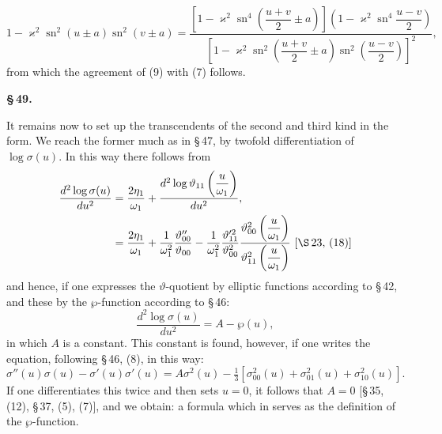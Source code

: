 
\[
1 - \varkappa^2\operatorname{sn}^2(u\pm a)\operatorname{sn}^2(v\pm a) = \dfrac{\left[1-\varkappa^2\operatorname{sn}^4\left(\dfrac{u+v}{2}\pm a\right)\right]\left(1-\varkappa^2\operatorname{sn}^4\dfrac{u-v}{2}\right)}{\left[1-\varkappa^2\operatorname{sn}^2\left(\dfrac{u+v}{2}\pm a\right)\operatorname{sn}^2\!\left(\dfrac{u-v}{2}\right)\right]^2},
\]
from which the agreement of (9) with (7) follows.

\begin{center}
\textbf{\S\,49. \\
}
\end{center}

It remains now to set up the transcendents of the second and
third kind in the  form. We reach the
former much as in \S\,47, by twofold differentiation of
$\log \sigma(u)$. In this way there follows from
\[
\begin{aligned}
\frac{d^2 \log \sigma(u)}{du^2} &= \frac{2\eta_1}{\omega_1} + \frac{d^2\log \vartheta_{11}\left(\dfrac{u}{\omega_1}\right)}{du^2},\\
&= \frac{2\eta_1}{\omega_1} + \frac{1}{\omega_1^2}\frac{\vartheta_{00}''}{\vartheta_{00}} - \frac{1}{\omega_1^2}\frac{\vartheta_{11}'^2}{\vartheta_{00}^2}\frac{\vartheta_{00}^2\left(\dfrac{u}{\omega_1}\right)}{\vartheta_{11}^2\left(\dfrac{u}{\omega_1}\right)} \ [\S\,23,\,(18)]
\end{aligned}
\]
and hence, if one expresses the $\vartheta$-quotient by elliptic
functions according to \S\,42, and these by the $\wp$-function according to \S\,46:
\[
\frac{d^2\log\sigma(u)}{du^2} = A - \wp(u),
\]
in which $A$ is a constant. This constant is found, however, if
one writes the equation, following \S\,46, (8), in this way:
\[
\sigma''(u)\sigma(u) - \sigma'(u)\sigma'(u) = A\sigma^2(u) - \tfrac{1}{3}\left[\sigma_{00}^2(u) + \sigma_{01}^2(u) + \sigma_{10}^2(u)\right].
\]
If one differentiates this twice and then sets $u=0$,
it follows that $A=0$ [\S\,35, (12), \S\,37, (5), (7)], and we
obtain:
a formula which in  serves as the definition of the $\wp$-function.
